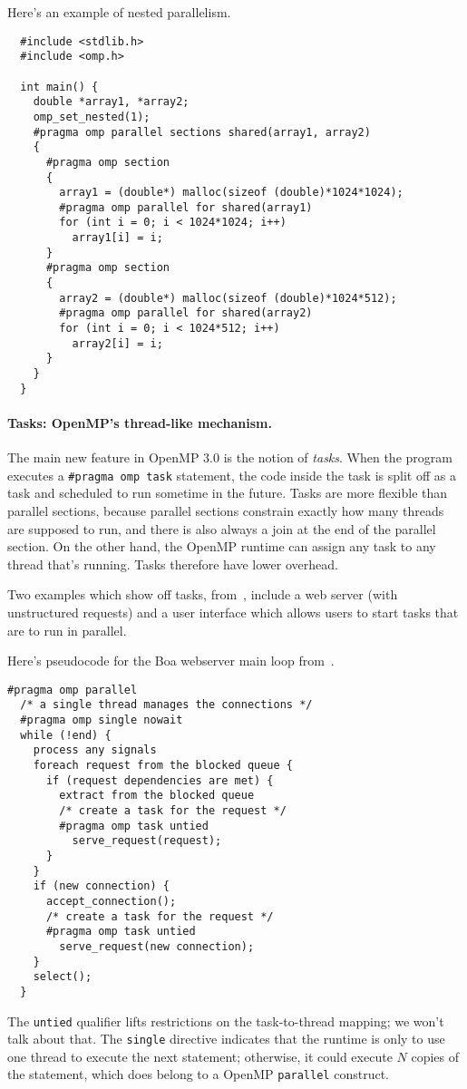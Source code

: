 Here's an example of nested parallelism.
{\small
\begin{verbatim}
  #include <stdlib.h>
  #include <omp.h>

  int main() {
    double *array1, *array2;
    omp_set_nested(1);
    #pragma omp parallel sections shared(array1, array2)
    {
      #pragma omp section
      {
        array1 = (double*) malloc(sizeof (double)*1024*1024);
        #pragma omp parallel for shared(array1)
        for (int i = 0; i < 1024*1024; i++)
          array1[i] = i;
      }
      #pragma omp section
      {
        array2 = (double*) malloc(sizeof (double)*1024*512);
        #pragma omp parallel for shared(array2)
        for (int i = 0; i < 1024*512; i++)
          array2[i] = i;
      }
    }
  }
\end{verbatim}
}

\paragraph{Tasks: OpenMP's thread-like mechanism.}
The main new feature in OpenMP 3.0 is the notion of \emph{tasks}. When
the program executes a \verb+#pragma omp task+ statement, the code
inside the task is split off as a task and scheduled to run sometime
in the future. Tasks are more flexible than parallel sections, because
parallel sections constrain exactly how many threads are supposed to
run, and there is also always a join at the end of the parallel
section.  On the other hand, the OpenMP runtime can assign any task to
any thread that's running. Tasks therefore have lower overhead.

Two examples which show off tasks,
from~\cite{Ayguade:2009:DOT:1512157.1512430}, include a web server (with
unstructured requests) and a user interface which allows users to
start tasks that are to run in parallel.

Here's pseudocode for the Boa webserver main loop from~\cite{Ayguade:2009:DOT:1512157.1512430}.
{\small
\begin{verbatim}
#pragma omp parallel
  /* a single thread manages the connections */
  #pragma omp single nowait
  while (!end) {
    process any signals
    foreach request from the blocked queue {
      if (request dependencies are met) {
        extract from the blocked queue
        /* create a task for the request */
        #pragma omp task untied
          serve_request(request);
      }
    }
    if (new connection) {
      accept_connection();
      /* create a task for the request */
      #pragma omp task untied
        serve_request(new connection);
    }
    select();
  }
\end{verbatim}
}
The {\tt untied} qualifier lifts restrictions on the task-to-thread mapping;
we won't talk about that. The {\tt single} directive indicates that the
runtime is only to use one thread to execute the next statement; otherwise,
it could execute $N$ copies of the statement, which does belong to a
OpenMP {\tt parallel} construct.

